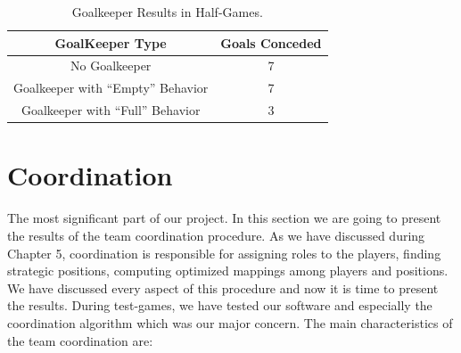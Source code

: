 \begin{table}[h!]
\begin{center}
    \begin{tabular}{cc}
    \textbf{GoalKeeper Type} 	& \textbf{Goals Conceded}\\
    \midrule
    No Goalkeeper						& 7\\
    Goalkeeper with ``Empty'' Behavior	& 7\\
    Goalkeeper with ``Full'' Behavior	& 3\\
    \end{tabular}
\end{center}
\label{GoalKeeperResults}
\caption{Goalkeeper Results in Half-Games.}
\end{table}





\section{Coordination}
The most significant part of our project. In this section we are going to present the results of the team coordination procedure. As we have discussed during Chapter 5, coordination is responsible for assigning roles to the players, finding strategic positions, computing optimized mappings among players and positions. We have discussed every aspect of this procedure and now it is time to present the results. During test-games, we have tested our software and especially the coordination algorithm which was our major concern. The main characteristics of the team coordination are:

